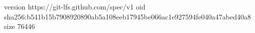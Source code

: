 version https://git-lfs.github.com/spec/v1
oid sha256:b541b15b7908920890ab5a108eeb17945be066ac1e927594fe040a47abed40a8
size 76446
